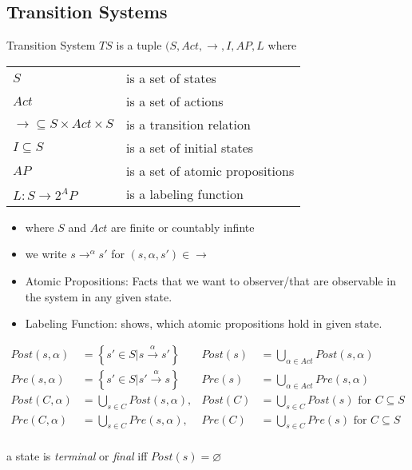 \documentclass[a4paper, 10pt]{article}
\begin{document}
\subsection*{Transition Systems}
\begin{shaded}
Transition System $TS$ is a tuple $(S,Act,\to,I,AP,L$ where \\
\begin{minipage}{0.48\textwidth}
\begin{tabular}{ll}
$S$ & is a set of states \\
$Act$ & is a set of actions \\
$\to\subseteq S\times Act\times S$ & is a transition relation \\
$I\subseteq S$ & is a set of initial states \\
$AP$ & is a set of atomic propositions \\
$L:S\to2^AP$ & is a labeling function \\
\end{tabular}
\end{minipage}
\hfill \vrule \hfill
\begin{minipage}{0.48\textwidth}
\begin{itemize}
    \item where $S$ and $Act$ are finite or countably infinte
    \item we write $s\to^\alpha s'$ for $\left(s,\alpha,s'\right)\in\to$
    \item Atomic Propositions: Facts that we want to observer/that are observable in the system in any given state.
    \item Labeling Function: shows, which atomic propositions hold in given state.
\end{itemize}
\end{minipage}
\end{shaded}

\begin{shaded}
    \begin{align*}
        Post(s,\alpha) &= \left\{ s'\in S | s\overset{\alpha}{\longrightarrow} s' \right\}
        & Post(s)&=\bigcup_{\alpha\in Act} Post(s,\alpha)
        \\
        Pre(s,\alpha) &= \left\{ s'\in S | s'\overset{\alpha}{\longrightarrow} s \right\}
        & Pre(s)&=\bigcup_{\alpha\in Act} Pre(s,\alpha)
        \\
        Post(C,\alpha) &= \bigcup_{s\in C} Post(s,\alpha),
        & Post(C) &= \bigcup_{s\in C} Post(s)\textrm{ for } C\subseteq S
        \\
        Pre(C,\alpha) &= \bigcup_{s\in C} Pre(s,\alpha),
        & Pre(C) &= \bigcup_{s\in C} Pre(s)\textrm{ for } C\subseteq S
        \\
    \end{align*}
    \begin{center}
    a state is \emph{terminal} or \emph{final} iff $Post(s)=\varnothing$
    \end{center}
\end{shaded}
\end{document}
